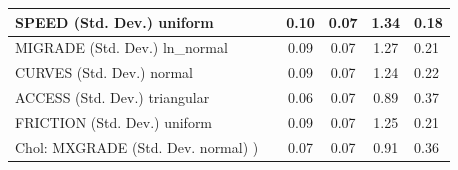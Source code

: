 \begin{table}
\begin{center}
\begin{tabular}{|l|l|c|c|c|l|}
			\hline
			SPEED (Std. Dev.) uniform &  & 0.10 & 0.07 & 1.34 & 0.18 \\
			\hline
			MIGRADE (Std. Dev.) ln_normal &  & 0.09 & 0.07 & 1.27 & 0.21 \\
			\hline
			CURVES (Std. Dev.) normal &  & 0.09 & 0.07 & 1.24 & 0.22 \\
			\hline
			ACCESS (Std. Dev.) triangular &  & 0.06 & 0.07 & 0.89 & 0.37 \\
			\hline
			FRICTION (Std. Dev.) uniform &  & 0.09 & 0.07 & 1.25 & 0.21 \\
			\hline
			 Chol: MXGRADE (Std. Dev. normal) ) &  & 0.07 & 0.07 & 0.91 & 0.36 \\
			\hline
		\end{tabular}
	\end{center}
\end{table}